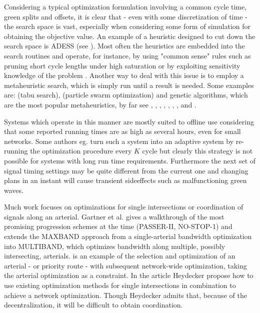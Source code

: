 Considering a typical optimization formulation involving a common
cycle time, green splits and offsets, it is clear that - even with some
discretization of time - the search space is vast, especially when
considering some form of simulation for obtaining the objective
value. An example of a heuristic designed to cut down the search
space is ADESS (see \citet{26}). Most often the heuristics are embedded
into the search routines and operate, for instance, by using "common
sense" rules such as pruning short cycle lengths under high
saturation or by exploiting sensitivity knowledge of the problem
\citet{40}.  Another way to deal with this issue is to employ a
metaheuristic search, which is simply run until a result is
needed. Some examples are: \citet{1} (tabu search), \citet{42} (particle
swarm optimization) and genetic algorithms, which are the most popular
metaheuristics, by far see \citet{13}, \citet{33}, \citet{43}, \citet{7},
\citet{41}, \citet{31}, \citet{27}, \citet{2} and \citet{26}.

Systems which operate in this manner are mostly suited to offline use
considering that some reported running times are as high as several
hours, even for small networks.  Some authors eg. \citet{16} turn
such a system into an adaptive system by re-running the optimization
procedure every $K$ cycle but clearly this strategy is not possible
for systems with long run time requirements. Furthermore the next set
of signal timing settings may be quite different from the current one
and changing plans in an instant will cause transient sideeffects such
as malfunctioning green waves.

Much work focuses on optimizations for single intersections or
coordination of signals along an arterial. Gartner et al. \citet{9}
gives a walkthrough of the most promising progression schemes at the
time (PASSER-II, NO-STOP-1) and extends the MAXBAND approach from a
single-arterial bandwidth optimization into MULTIBAND, which optimizes
bandwidth along multiple, possibly intersecting, arterials. \citet{6}
is an example of the selection and optimization of an arterial - or
priority route - with subsequent network-wide optimization, taking the
arterial optimization as a constraint.  In the article \citet{24}
Heydecker propose how to use existing optimization methods for single
intersections in combination to achieve a network optimization. Though
Heydecker admits that, because of the decentralization, it will be
difficult to obtain coordination.
